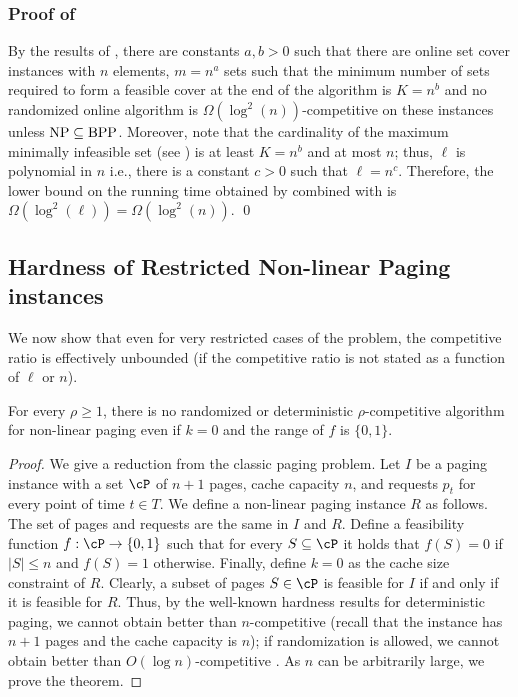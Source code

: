 \subsubsection*{Proof of }

By the results of \cite{korman2004use}, there are constants $a,b>0$ such that there are online set cover instances with $n$ elements, $m = n^a$ sets such that the minimum number of sets required to form a feasible cover at the end of the algorithm is $K = n^b$ and no randomized online algorithm is $\Omega(\log^2\left(n\right))$-competitive on these instances unless $\textnormal{NP}\subseteq \textnormal{BPP}$. Moreover, note that the cardinality of the maximum minimally infeasible set (see ) is at least $K = n^b$ and at most $n$; thus, $\ell$ is polynomial in $n$ i.e., there is a constant $c>0$ such that $\ell = n^c$. Therefore, the lower bound on the running time obtained by  combined with \cite{korman2004use} is $\Omega(\log^2\left(\ell\right)) = \Omega(\log^2\left(n\right))$. \qed


\subsection{Hardness of Restricted Non-linear Paging instances}
\label{sec:hardRestricted}

We now show that even for very restricted cases of the problem, the competitive ratio is effectively unbounded (if the competitive ratio is not stated as a function of $\ell$ or $n$). 

\begin{theorem}
\label{thm:HardnessRestricted}
For every $\rho \geq 1$, there is no randomized or deterministic $\rho$-competitive algorithm for \textnormal{non-linear paging} even if $k = 0$ and the range of $f$ is $\{0,1\}$.
\end{theorem}

\begin{proof}
We give a reduction from the classic paging problem. Let $I$ be a paging instance with a set $\cP$ of $n+1$ pages, cache capacity $n$, and requests $p_t$ for every point of time $t \in T$. We define a non-linear paging instance $R$ as follows. The set of pages and requests are the same in $I$ and $R$. Define a feasibility function $f:\cP \rightarrow \{0,1\}$ such that for every $S \subseteq \cP$ it holds that $f(S) = 0$ if $|S| \leq n$ and $f(S) = 1$ otherwise. Finally, define $k = 0$ as the cache size constraint of $R$. Clearly, a subset of pages $S \in \cP$ is feasible for $I$ if and only if it is feasible for $R$. Thus, by the well-known hardness results for deterministic paging, we cannot obtain better than $n$-competitive \cite{sleator1985amortized} (recall that the instance has $n+1$ pages and the cache capacity is $n$); if randomization is allowed, we cannot obtain better than $O(\log n)$-competitive \cite{fiat1991competitive}. As $n$ can be arbitrarily large, we prove the theorem.  
\end{proof}